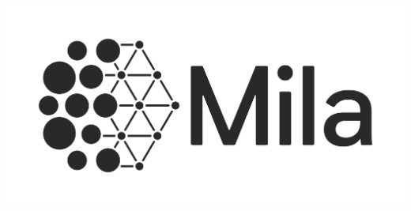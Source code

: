 \documentclass[portrait,a0b,final,a4resizeable]{a0poster}
\begin{document}
\begin{poster}
{    \begin{minipage}[c][0.1\paperheight][c]{0.33\textwidth}\includegraphics[height=3.2in]{../figures/mila.png} \end{minipage}
    }
\end{poster}
\end{document}
